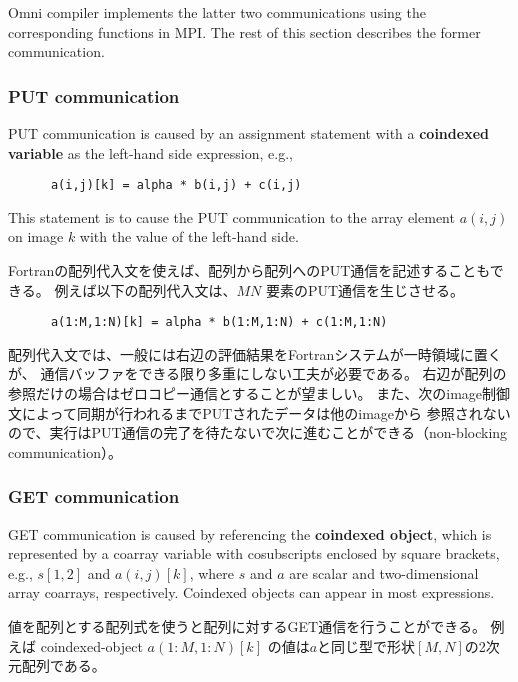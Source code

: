 Omni compiler implements the latter two communications using the corresponding 
functions in MPI. The rest of this section describes the former communication.

\subsubsection{PUT communication}\label{sec:PUT}

PUT communication is caused by an assignment statement with a {\bf coindexed variable} 
as the left-hand side expression, e.g.,
\begin{verbatim}
      a(i,j)[k] = alpha * b(i,j) + c(i,j)
\end{verbatim}
This statement is to cause the PUT communication to the array element $a(i,j)$ on image $k$
with the value of the left-hand side.

Fortranの配列代入文を使えば、配列から配列へのPUT通信を記述することもできる。
例えば以下の配列代入文は、$M N$ 要素のPUT通信を生じさせる。
\begin{verbatim}
      a(1:M,1:N)[k] = alpha * b(1:M,1:N) + c(1:M,1:N)
\end{verbatim}

\requirement
配列代入文では、一般には右辺の評価結果をFortranシステムが一時領域に置くが、
通信バッファをできる限り多重にしない工夫が必要である。
右辺が配列の参照だけの場合はゼロコピー通信とすることが望ましい。
また、次のimage制御文によって同期が行われるまでPUTされたデータは他のimageから
参照されないので、実行はPUT通信の完了を待たないで次に進むことができる（non-blocking communication）。


\subsubsection{GET communication}\label{sec:GET}

GET communication is caused by referencing the {\bf coindexed object}, 
which is represented by a coarray variable with cosubscripts enclosed by square brackets, 
e.g., $s[1,2]$ and $a(i,j)[k]$, where $s$ and $a$ are scalar and two-dimensional array coarrays,
respectively.
Coindexed objects can appear in most expressions.

値を配列とする配列式を使うと配列に対するGET通信を行うことができる。
例えば coindexed-object $a(1:M,1:N)[k]$ の値は$a$と同じ型で形状$[M, N]$の2次元配列である。



